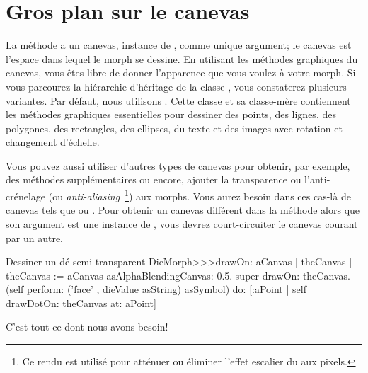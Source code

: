 \documentclass[a4paper,10pt,twoside]{book}
\begin{document}
\section{Gros plan sur le canevas}

La méthode  a un canevas, instance de
, comme unique argument;
le canevas est l'espace dans lequel le morph se dessine.
En utilisant les méthodes graphiques du canevas, vous êtes libre
de donner l'apparence que vous voulez à votre morph.
Si vous parcourez la hiérarchie d'héritage de la classe
, vous constaterez plusieurs variantes. Par défaut, nous
utilisons . Cette classe et sa classe-mère
 contiennent les méthodes graphiques essentielles pour
dessiner des points, des lignes, des polygones, des rectangles, des
ellipses, du texte et des images avec rotation et changement d'échelle. 

Vous pouvez aussi utiliser d'autres types de canevas pour obtenir, par
exemple, des méthodes supplémentaires ou encore, ajouter la
transparence ou l'anti-crénelage (ou
\emph{anti-aliasing}~\footnote{Ce rendu est utilisé pour atténuer
  ou éliminer l'effet escalier du aux pixels.}) aux morphs.  
Vous aurez besoin dans ces cas-là de canevas tels que
 ou .
Pour obtenir un canevas différent dans la méthode 
alors que son argument est une instance de , vous devrez
court-circuiter le canevas courant par un autre. 


\begin{method}{Dessiner un dé semi-transparent}
DieMorph>>>drawOn: aCanvas
	| theCanvas |
	theCanvas := aCanvas asAlphaBlendingCanvas: 0.5.
	super drawOn: theCanvas.
	(self perform: ('face' , dieValue asString) asSymbol)
		do: [:aPoint | self drawDotOn: theCanvas at: aPoint]
\end{method}
\noindent

C'est tout ce dont nous avons besoin! 
\end{document}
